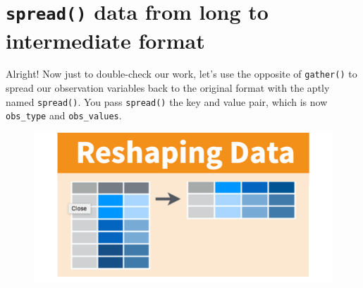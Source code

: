 \documentclass[]{book}
\newenvironment{Shaded}{\begin{snugshade}}{\end{snugshade}}
\newcommand{\KeywordTok}[1]{\textcolor[rgb]{0.13,0.29,0.53}{\textbf{#1}}}
\newcommand{\DataTypeTok}[1]{\textcolor[rgb]{0.13,0.29,0.53}{#1}}
\newcommand{\StringTok}[1]{\textcolor[rgb]{0.31,0.60,0.02}{#1}}
\newcommand{\CommentTok}[1]{\textcolor[rgb]{0.56,0.35,0.01}{\textit{#1}}}
\newcommand{\OperatorTok}[1]{\textcolor[rgb]{0.81,0.36,0.00}{\textbf{#1}}}
\newcommand{\NormalTok}[1]{#1}
\theoremstyle{definition}
\theoremstyle{definition}
\theoremstyle{definition}
\theoremstyle{remark}
\begin{document}
\begin{Shaded}
\end{Shaded}

\section{\texorpdfstring{\texttt{spread()} data from long to
intermediate
format}{spread() data from long to intermediate format}}\label{spread-data-from-long-to-intermediate-format}

Alright! Now just to double-check our work, let's use the opposite of
\texttt{gather()} to spread our observation variables back to the
original format with the aptly named \texttt{spread()}. You pass
\texttt{spread()} the key and value pair, which is now
\texttt{obs\_type} and \texttt{obs\_values}.

\begin{figure}
\centering
\includegraphics{img/rstudio-cheatsheet-reshaping-data-spread.png}
\caption{}
\end{figure}

\begin{Shaded}
\end{Shaded}
\end{document}
